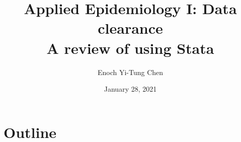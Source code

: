 

\title[Applied Epi I: Data clearance]{Applied Epidemiology I: Data clearance\\ A review of using Stata}
\date{January 28, 2021}
\author[Enoch Yi-Tung Chen]{Enoch Yi-Tung Chen}




\begin{frame}
\maketitle 
\end{frame}



\section*{Outline}
\begin{frame}{\secname}
 \begin{columns}[t]
        \begin{column}{.5\textwidth}
            \tableofcontents[sections={1-4}]
        \end{column}
        \begin{column}{.5\textwidth}
            \tableofcontents[sections={5-7}]
        \end{column}
\end{columns}
\end{frame}


